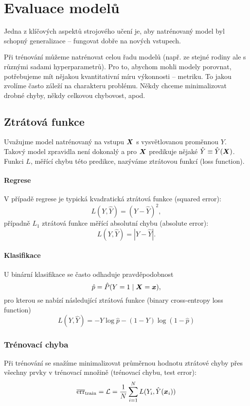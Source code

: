 \section{Evaluace modelů}

Jedna z klíčových aspektů strojového učení je, aby natrénovaný model byl schopný generalizace -- fungovat dobře na nových vstupech.

Při trénování můžeme natrénovat celou řadu modelů (např. ze stejné rodiny ale s různými sadami hyperparametrů). Pro to, abychom mohli modely porovnat, potřebujeme mít nějakou kvantitativní míru výkonnosti -- metriku. To jakou zvolíme často záleží na charakteru problému. Někdy chceme minimalizovat drobné chyby, někdy celkovou chybovost, apod.

\subsection{Ztrátová funkce}

Uvažujme model natrénovaný na vstupu $\bm{X}$ s vysvětlovanou proměnnou $Y$. Takový model zpravidla není dokonalý a pro $\bm{X}$ predikuje nějaké $\hat{Y} \equiv \hat{Y}(\bm{X})$. Funkci $L$, měřící chybu této predikce, nazýváme ztrátovou funkcí (loss function).

\paragraph{Regrese} V případě regrese je typická kvadratická ztrátová funkce (squared error): \[L(Y, \hat{Y}) = (Y - \hat{Y})^2, \] případně $L_1$  ztrátová funkce měřící absolutní chybu (absolute error): \[L(Y, \hat{Y}) = |Y - \hat{Y}|.\]

\paragraph{Klasifikace} U binární klasifikace se často odhaduje pravděpodobnost \[\hat{p} = \hat{P}(Y=1 \mid \bm{X} = \bm{x}),\] pro kterou se nabízí následující ztrátová funkce (binary cross-entropy loss function) \[L(Y, \hat{Y}) = -Y\log\hat{p} - (1-Y)\log(1-\hat{p})\]

\subsubsection{Trénovací chyba}

Při trénování se snažíme minimalizovat průměrnou hodnotu ztrátové chyby přes všechny prvky v trénovací množině (trénovací chybu, test error): \[\overline{\text{err}}_{\text{train}} = \mathcal{L} = \frac{1}{N} \sum_{i=1}^{N} L(Y_i, \hat{Y}(\bm{x}_i))\]

